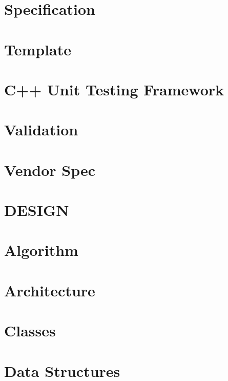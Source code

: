 \documentclass[twoside]{book}
\newcommand{\+}{\discretionary{\mbox{\scriptsize$\hookleftarrow$}}{}{}}
\begin{document}
\chapter{Specification}
\label{doc_decisions_specification_md}

\chapter{Template}
\label{doc_decisions_template_md}

\chapter{C++ Unit Testing Framework}
\label{doc_decisions_unit_testing_md}

\chapter{Validation}
\label{doc_decisions_validation_md}

\chapter{Vendor Spec}
\label{doc_decisions_vendor_spec_md}

\chapter{D\+E\+S\+I\+GN}
\label{doc_DESIGN_md}

\chapter{Algorithm}
\label{doc_dev_algorithm_md}

\chapter{Architecture}
\label{doc_dev_architecture_md}

\chapter{Classes}
\label{doc_dev_classes_md}

\chapter{Data Structures}
\label{doc_dev_data-structures_md}

\end{document}
